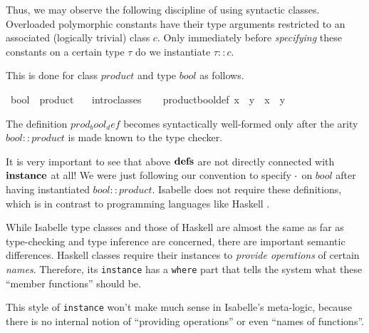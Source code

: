 \begin{isabellebody}
\begin{isamarkuptext}
 \medskip Thus, we may observe the following discipline of using
 syntactic classes.  Overloaded polymorphic constants have their type
 arguments restricted to an associated (logically trivial) class $c$.
 Only immediately before \emph{specifying} these constants on a
 certain type $\tau$ do we instantiate $\tau :: c$.

 This is done for class $product$ and type $bool$ as follows.%
\end{isamarkuptext}%
\ bool\ {\isacharcolon}{\isacharcolon}\ product\isanewline
\ \ \ intro{\isacharunderscore}classes\isanewline
{}\ {\isacharparenleft}\isanewline
\ \ product{\isacharunderscore}bool{\isacharunderscore}def{\isacharcolon}\ {\isachardoublequote}x\ {\isasymOtimes}\ y\ {\isasymequiv}\ x\ {\isasymand}\ y{\isachardoublequote}%
\begin{isamarkuptext}%
The definition $prod_bool_def$ becomes syntactically well-formed only
 after the arity $bool :: product$ is made known to the type checker.

 \medskip It is very important to see that above ${\mathord{\mathbf{defs}}}$ are not
 directly connected with ${\mathord{\mathbf{instance}}}$ at all!  We were
 just following our convention to specify $\cdot$ on $bool$ after
 having instantiated $bool :: product$.  Isabelle does not require
 these definitions, which is in contrast to programming languages like
 Haskell \cite{haskell-report}.

 \medskip While Isabelle type classes and those of Haskell are almost
 the same as far as type-checking and type inference are concerned,
 there are important semantic differences.  Haskell classes require
 their instances to \emph{provide operations} of certain \emph{names}.
 Therefore, its \texttt{instance} has a \texttt{where} part that tells
 the system what these ``member functions'' should be.

 This style of \texttt{instance} won't make much sense in Isabelle's
 meta-logic, because there is no internal notion of ``providing
 operations'' or even ``names of functions''.%
\end{isamarkuptext}%
\end{isabellebody}%
